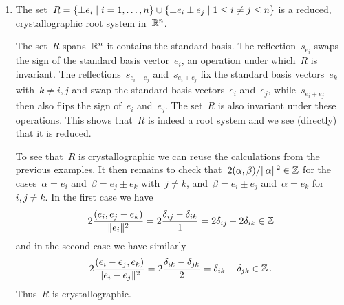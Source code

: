 \begin{examples}
\begin{enumerate}
\begin{center}
      \end{center}
    \item
      The set~$R = \{ \pm e_i \suchthat i = 1, \dotsc, n \} \cup \{ \pm e_i \pm e_j \suchthat 1 \leq i \neq j \leq n\}$ is a reduced, crystallographic root system in~$\mathbb{R}^n$.
      
      The set~$R$ spans~$\mathbb{R}^n$ it contains the standard basis.
      The reflection~$s_{e_i}$ swaps the sign of the standard basis vector~$e_i$, an operation under which~$R$ is invariant.
      The reflections~$s_{e_i - e_j}$ and~$s_{e_i + e_j}$ fix the standard basis vectors~$e_k$ with~$k \neq i,j$ and swap the standard basis vectors~$e_i$ and~$e_j$, while~$s_{e_i+e_j}$ then also flips the sign of~$e_i$ and~$e_j$.
      The set~$R$ is also invariant under these operations.
      This shows that~$R$ is indeed a root system and we see (directly) that it is reduced.
      
      To see that~$R$ is crystallographic we can reuse the calculations from the previous examples.
      It then remains to check that~$2 (\alpha, \beta)/\lVert\alpha\rVert^2 \in \mathbb{Z}$ for the cases~$\alpha = e_i$ and~$\beta = e_j \pm e_k$ with~$j \neq k$, and~$\beta = e_i \pm e_j$ and~$\alpha = e_k$ for~$i,j \neq k$.
      In the first case we have
      \[
        2 \frac{(e_i, e_j - e_k)}{\lVert e_i\rVert^2}
        =
        2 \frac{\delta_{ij} - \delta_{ik}}{1}
        =
        2 \delta_{ij} - 2 \delta_{ik}
        \in
        \mathbb{Z}
      \]
      and in the second case we have similarly
      \[
        2 \frac{(e_i - e_j, e_k)}{\lVert e_i - e_j\rVert^2}
        =
        2 \frac{\delta_{ik} - \delta_{jk}}{2}
        =
        \delta_{ik} - \delta_{jk}
        \in
        \mathbb{Z} \,.
      \]
      Thus~$R$ is crystallographic.
      

\end{enumerate}
\end{examples}
